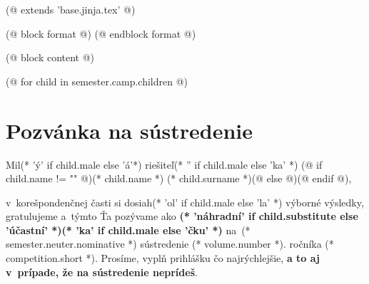 (@ extends 'base.jinja.tex' @)

(@ block format @)
    \renewcommand{\headrulewidth}{0pt}
    \renewcommand{\footrulewidth}{0pt}
(@ endblock format @)

(@ block content @)
    \pagestyle{seminar-invite}

    (@ for child in semester.camp.children @)
        \section{Pozvánka na sústredenie}
            Mil(* 'ý' if child.male else 'á'*) riešiteľ(* '' if child.male else 'ka' *)
            (@ if child.name != "" @)(* child.name *) (* child.surname *)(@ else @)\makebox[50mm]{\dotfill}(@ endif @),

            v~korešpondenčnej časti si dosiah(* 'ol' if child.male else 'la' *) výborné výsledky,
            gratulujeme a~týmto Ťa pozývame ako \textbf{(* 'náhradní' if child.substitute else 'účastní' *)(* 'ka' if child.male else 'čku' *)}
            na~(* semester.neuter.nominative *) sústredenie (* volume.number *). ročníka (* competition.short *).
            Prosíme, vyplň prihlášku čo najrýchlejšie, \textbf{a to aj v~prípade, že na sústredenie neprídeš}.

